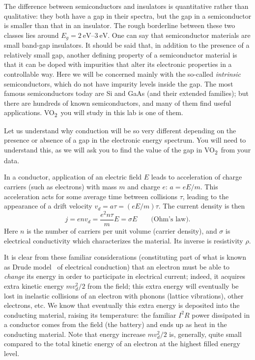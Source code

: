 \documentclass[11pt,a4paper]{article}
\newcommand{\VOtwo}{VO\textsubscript{2}}
\begin{document}
The difference between semiconductors and insulators is quantitative rather than
qualitative: they both have a gap in their spectra, but the gap in a semiconductor
is smaller than that in an insulator. The rough borderline between these two
classes lies around $E_g = \SIrange{2}{3}{\electronvolt}$. One can say that
semiconductor materials are small band-gap insulators. It should be said that, in
addition to the presence of a relatively small gap, another defining property of a
semiconductor material is that it can be doped with impurities that alter its
electronic properties in a controllable way. Here we will be concerned mainly with
the so-called \emph{intrinsic} semiconductors, which do not have impurity levels
inside the gap. The most famous semiconductors today are Si and GaAs (and their
extended families); but there are hundreds of known semiconductors, and many of
them find useful applications. \VOtwo\ you will study in this lab is one of them.

Let us understand why conduction will be so very different depending on the
presence or absence of a gap in the electronic energy spectrum. You will need to understand
this, as we will ask you to find the value of the gap in \VOtwo\ from your data.

In a conductor, application of an electric field $E$ leads to acceleration of
charge carriers (such as electrons) with mass $m$ and charge $e$: $a = eE/m$. This
acceleration acts for some average time between collisions $\tau$, leading to the
appearance of a drift velocity $v_d = a\tau = (eE/m)\tau$. The current density is
then
\begin{equation}\label{eq:ohm}
  j = e n v_d = \frac{e^{2}n\tau}{m}E = \sigma E
  \qquad\text{(Ohm's law).}
\end{equation}
Here $n$ is the number of carriers per unit volume (carrier density), and $\sigma$
is electrical conductivity which characterizes the material. Its inverse is
resistivity $\rho$.

It is clear from these familiar considerations (constituting part of what is known
as Drude model~\cite{ref:blakemore,ref:ashcroft} of electrical conduction) that an
electron must be able to \emph{change} its energy in order to participate in
electrical current; indeed, it acquires extra kinetic energy $m v_d^2/2$ from the
field; this extra energy will eventually be lost in inelastic collisions of an
electron with phonons (lattice vibrations), other electrons, etc. We know that
eventually this extra energy is deposited into the conducting material, raising
its temperature: the familiar $I^2R$ power dissipated in a conductor comes from
the field (the battery) and ends up as heat in the conducting material. Note that
energy increase $m v_d^2/2$ is, generally, quite small compared to the total
kinetic energy of an electron at the highest filled energy level.
\end{document}
